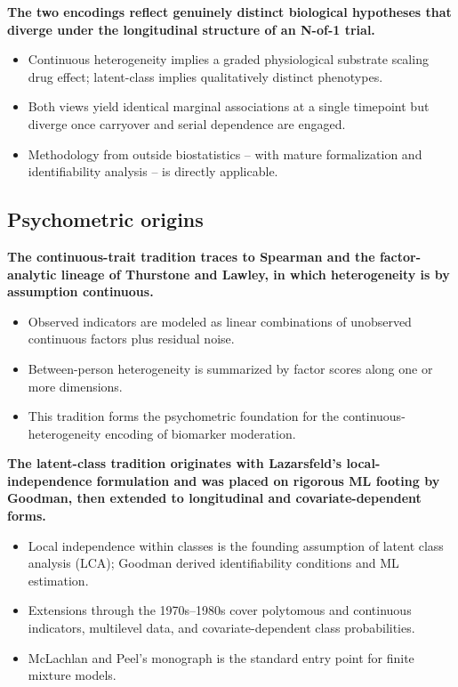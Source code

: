 \documentclass[
  11pt,
]{article}
\begin{document}
\textbf{The two encodings reflect genuinely distinct biological
hypotheses that diverge under the longitudinal structure of an N-of-1
trial.}

\begin{itemize}\setlength{\itemsep}{2pt}\setlength{\parskip}{0pt}
\item Continuous heterogeneity implies a graded physiological substrate
  scaling drug effect; latent-class implies qualitatively distinct
  phenotypes.
\item Both views yield identical marginal associations at a single
  timepoint but diverge once carryover and serial dependence are
  engaged.
\item Methodology from outside biostatistics -- with mature
  formalization and identifiability analysis -- is directly applicable.
\end{itemize}

\subsection{Psychometric origins}\label{psychometric-origins}

\textbf{The continuous-trait tradition traces to Spearman and the
factor-analytic lineage of Thurstone and Lawley, in which heterogeneity
is by assumption continuous.}

\begin{itemize}\setlength{\itemsep}{2pt}\setlength{\parskip}{0pt}
\item Observed indicators are modeled as linear combinations of
  unobserved continuous factors plus residual noise.
\item Between-person heterogeneity is summarized by factor scores along
  one or more dimensions.
\item This tradition forms the psychometric foundation for the
  continuous-heterogeneity encoding of biomarker moderation.
\end{itemize}

\textbf{The latent-class tradition originates with Lazarsfeld's local-
independence formulation and was placed on rigorous ML footing by
Goodman, then extended to longitudinal and covariate-dependent forms.}

\begin{itemize}\setlength{\itemsep}{2pt}\setlength{\parskip}{0pt}
\item Local independence within classes is the founding assumption of
  latent class analysis (LCA); Goodman derived identifiability
  conditions and ML estimation.
\item Extensions through the 1970s--1980s cover polytomous and
  continuous indicators, multilevel data, and covariate-dependent
  class probabilities.
\item McLachlan and Peel's monograph is the standard entry point for
  finite mixture models.
\end{itemize}
\end{document}
